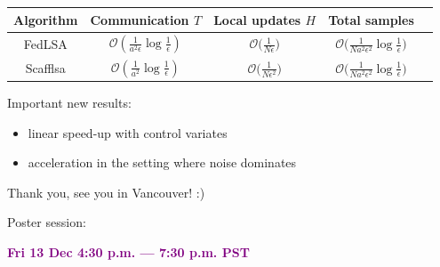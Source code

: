 \documentclass[17pt,aspectratio=169]{beamer}
\begin{document}
\begin{frame}
  \begin{table}
        \renewcommand{\arraystretch}{1.5}
        \small
    \centering 
    \begin{tabular*}{1\textwidth}{@{\extracolsep{\fill}} ccccc }
    \toprule
        Algorithm & 
        Communication $T$ &
        Local updates $H$ &
        Total samples 
    \\
    \midrule
         FedLSA
         &
          $\displaystyle\mathcal{O} \left({\tfrac{1}{ a^2 \epsilon}} \log{\tfrac{1}{\epsilon}} \right)$
         &
         $\displaystyle\mathcal{O} \bigl( \tfrac{1}{N \epsilon}\bigr)$
         &
         $\displaystyle\mathcal{O}\bigl(\tfrac{1}{ N a^2 \epsilon^2} \log{\tfrac{1}{\epsilon}}\bigr)$
    \\
        Scafflsa &
        $\displaystyle\mathcal{O}\left( \tfrac{1}{a^2} \log \tfrac{1}{\epsilon}\right)$
        & 
        $\displaystyle\mathcal{O}\bigl(\tfrac{1}{N \epsilon^2} \bigr)$
        &
        $\displaystyle\mathcal{O}\bigl(\tfrac{1}{ N a^2 \epsilon^2} \log{\tfrac{1}{\epsilon}}\bigr)$
    \\
    \bottomrule
    \end{tabular*}
  \end{table}

  Important new results:
  \begin{itemize}
  \item linear speed-up with control variates
  \item acceleration in the setting where noise dominates
  \end{itemize}
\end{frame}

\begin{frame}
  \begin{center}
    
    \large
    Thank you, see you in Vancouver! :)

    \vspace{2em}

    \large
    Poster session:
    
    \textcolor{purple}{\textbf{Fri 13 Dec 4:30 p.m. — 7:30 p.m. PST}}
  \end{center}
\end{frame}
\end{document}
